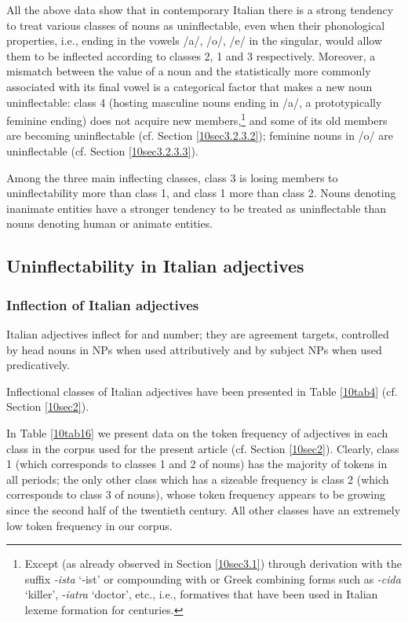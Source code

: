 \documentclass[output=paper,colorlinks,citecolor=brown]{langscibook}
\begin{document}
All the above data show that in contemporary Italian there is a strong tendency to treat various classes of nouns as uninflectable, even when their phonological properties, i.e., ending in the vowels /a/, /o/, /e/ in the singular, would allow them to be inflected according to classes 2, 1 and 3 respectively. Moreover, a mismatch between the  value of a noun and the  statistically more commonly associated with its final vowel is a categorical factor that makes a new noun uninflectable: class 4 (hosting masculine nouns ending in /a/, a prototypically feminine ending) does not acquire new members,\footnote{Except (as already observed in Section \ref{10sec3.1}) through derivation with the suffix \emph{-ista} `‑ist' or compounding with  or Greek combining forms such as \emph{-cida} `killer', ‑\emph{iatra} `doctor', etc., i.e., formatives that have been used in Italian lexeme formation for centuries.} and some of its old members are becoming uninflectable (cf. Section \ref{10sec3.2.3.2}); feminine nouns in /o/ are uninflectable (cf. Section \ref{10sec3.2.3.3}).

Among the three main inflecting classes, class 3 is losing members to uninflectability more than class 1, and class 1 more than class 2. Nouns denoting inanimate entities have a stronger tendency to be treated as uninflectable than nouns denoting human or animate entities.

\subsection{Uninflectability in Italian adjectives}

\subsubsection{Inflection of Italian adjectives}

Italian adjectives inflect for  and number; they are agreement targets, controlled by head nouns in NPs when used attributively and by subject NPs when used predicatively.

Inflectional classes of Italian adjectives have been presented in Table \ref{10tab4} (cf. Section \ref{10sec2}).

In Table \ref{10tab16} we present data on the token frequency of adjectives in each class in the corpus used for the present article (cf. Section \ref{10sec2}). Clearly, class 1 (which corresponds to classes 1 and 2 of nouns) has the majority of tokens in all periods; the only other class which has a sizeable frequency is class 2 (which corresponds to class 3 of nouns), whose token frequency appears to be growing since the second half of the twentieth century. All other classes have an extremely low token frequency in our corpus.
\end{document}
